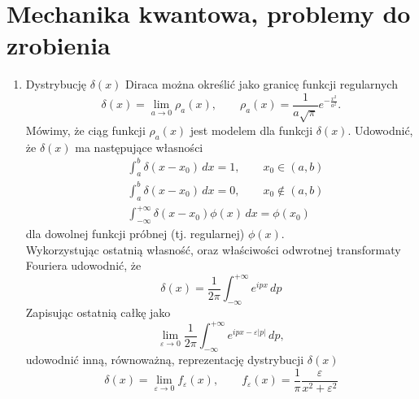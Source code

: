 \documentclass[a4paper,11pt]{article}
\begin{document}










\section{Mechanika kwantowa, problemy do zrobienia}





\begin{enumerate}

\item Dystrybucję $\delta( x )$ Diraca można określić jako granicę
  funkcji regularnych
  \begin{equation}
    \label{QM:01}
    \delta( x ) = \lim_{ a \to 0 } \rho_{ a }( x ), \qquad
    \rho_{ a }( x ) =
    \frac{ 1 }{ a \sqrt{ \pi } } e^{ -\frac{ x^{ 2 } }{ a^{ 2 } } }.
  \end{equation}
  Mówimy, że ciąg funkcji $\rho_{ a }( x )$ jest modelem dla funkcji
  $\delta( x )$. Udowodnić, że $\delta( x )$ ma następujące własności
  \begin{align}
    &\int_{ a }^{ b } \delta( x - x_{ 0 } ) \, dx = 1, \qquad
      x_{ 0 } \in ( a, b ) \\
    &\int_{ a }^{ b } \delta( x - x_{ 0 } ) \, dx = 0, \qquad
      x_{ 0 } \notin ( a, b ) \\
    &\int_{ -\infty }^{ +\infty } \delta( x - x_{ 0 } ) \phi( x ) \, dx = \phi( x_{ 0 } )
  \end{align}
  dla dowolnej funkcji próbnej (tj. regularnej) $\phi( x )$. \\
  Wykorzystując ostatnią własność, oraz właściwości odwrotnej
  transformaty Fouriera udowodnić, że
  \begin{equation}
    \label{QM:02}
    \delta( x ) = \frac{ 1 }{ 2\pi } \int_{ -\infty }^{ +\infty } e^{ i p x } \, dp
  \end{equation}
  Zapisując ostatnią całkę jako
  \begin{equation}
    \label{QM:03}
    \lim_{ \varepsilon \to 0 } \frac{ 1 }{ 2\pi } \int_{ -\infty }^{ +\infty } e^{ ipx - \varepsilon | p | } \, dp,
  \end{equation}
  udowodnić inną, równoważną, reprezentację dystrybucji $\delta( x )$
  \begin{equation}
    \label{QM:04}
    \delta( x ) = \lim_{ \varepsilon \to 0 } f_{ \varepsilon }( x ), \qquad
    f_{ \varepsilon }( x ) = \frac{ 1 }{ \pi } \frac{ \varepsilon }{ x^{ 2 } + \varepsilon^{ 2 } }
  \end{equation}


\end{enumerate}
\end{document}

